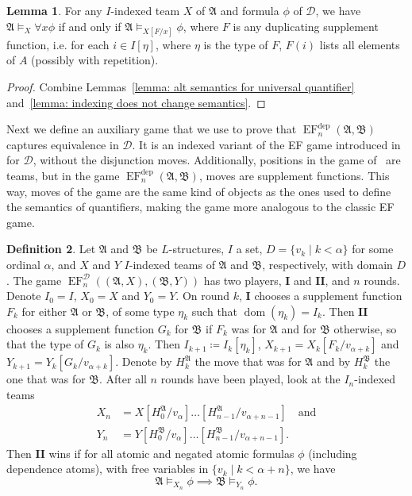\documentclass[12pt]{article}
\theoremstyle{definition}
\newtheorem{definition}{Definition}[section]
\newtheorem{lemma}[definition]{Lemma}
\newcommand{\playerone}{\mathrm{\mathbf{I}}}
\newcommand{\playertwo}{\mathrm{\mathbf{II}}}
\DeclareMathOperator{\EF}{EF}
\newcommand{\EFdep}{\EF^{\mathrm{dep}}}
\newcommand{\A}{\mathfrak{A}}
\newcommand{\B}{\mathfrak{B}}
\newcommand{\deplog}{\mathcal D}
\DeclareMathOperator{\dom}{dom}
\begin{document}
\begin{lemma}
    For any $I$-indexed team $X$ of $\A$ and formula $\phi$ of $\deplog$, we have $\A\models_X\forall x\phi$ if and only if $\A\models_{X[F/x]}\phi$, where $F$ is any duplicating supplement function, i.e. for each $i\in I[\eta]$, where $\eta$ is the type of $F$, $F(i)$ lists all elements of $A$ (possibly with repetition).
\end{lemma}
\begin{proof}
    Combine Lemmas~\ref{lemma: alt semantics for universal quantifier} and~\ref{lemma: indexing does not change semantics}.
\end{proof}

Next we define an auxiliary game that we use to prove that $\EFdep_n(\A,\B)$ captures equivalence in $\deplog$. It is an indexed variant of the EF game introduced in~\cite{MR2351449} for $\deplog$, without the disjunction moves.
Additionally, positions in the game of~\cite{MR2351449} are teams, but in the game $\EFdep_n(\A,\B)$, moves are supplement functions. This way, moves of the game are the same kind of objects as the ones used to define the semantics of quantifiers, making the game more analogous to the classic EF game.

\begin{definition}
    Let $\A$ and $\B$ be $L$-structures, $I$ a set, $D = \{v_k \mid k<\alpha\}$ for some ordinal $\alpha$, and $X$ and $Y$ $I$-indexed teams of $\A$ and $\B$, respectively, with domain $D$. The game $\EF^\deplog_n((\A,X),(\B,Y))$ has two players, $\playerone$ and $\playertwo$, and $n$ rounds. Denote $I_0 = I$, $X_0 = X$ and $Y_0 = Y$. On round $k$, $\playerone$ chooses a supplement function $F_k$ for either $\A$ or $\B$, of some type $\eta_k$ such that $\dom(\eta_k) = I_k$. Then $\playertwo$ chooses a supplement function $G_k$ for $\B$ if $F_k$ was for $\A$ and for $\B$ otherwise, so that the type of $G_k$ is also $\eta_k$. Then $I_{k+1} \coloneqq I_k[\eta_k]$, $X_{k+1} = X_k[F_k/v_{\alpha+k}]$ and $Y_{k+1} = Y_k[G_k/v_{\alpha+k}]$. Denote by $H_k^\A$ the move that was for $\A$ and by $H_k^\B$ the one that was for $\B$. After all $n$ rounds have been played, look at the $I_n$-indexed teams
    \begin{align*}
        X_n &= X[H^\A_0/v_\alpha]\dots[H^\A_{n-1}/v_{\alpha+n-1}] \quad\text{and} \\
        Y_n &= Y[H^\B_0/v_\alpha]\dots[H^\B_{n-1}/v_{\alpha+n-1}].
    \end{align*}
    Then $\playertwo$ wins if for all atomic and negated atomic formulas $\phi$ (including dependence atoms), with free variables in $\{v_k \mid k<\alpha+n\}$, we have
    \[
        \A\models_{X_n}\phi \implies \B\models_{Y_n}\phi.
    \]
\end{definition}
\end{document}
